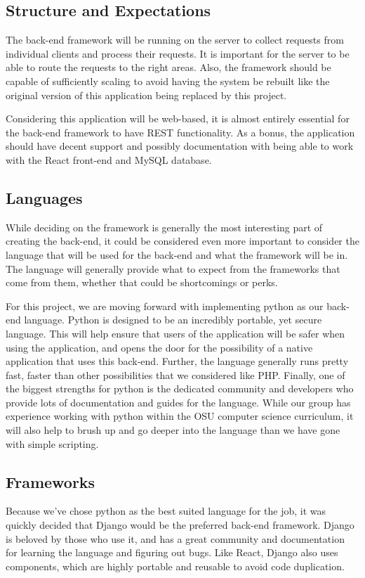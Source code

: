 \documentclass[onecolumn, draftclsnofoot,10pt, compsoc]{IEEEtran}
\begin{document}
    \subsection{Structure and Expectations}
        The back-end framework will be running on the server to collect requests from individual clients and process their requests. It is important for the server to be able to route the requests to the right areas. Also, the framework should be capable of sufficiently scaling to avoid having the system be rebuilt like the original version of this application being replaced by this project.
        
        Considering this application will be web-based, it is almost entirely essential for the back-end framework to have REST functionality. As a bonus, the application should have decent support and possibly documentation with being able to work with the React front-end and MySQL database. 
    \subsection{Languages}
        While deciding on the framework is generally the most interesting part of creating the back-end, it could be considered even more important to consider the language that will be used for the back-end and what the framework will be in. The language will generally provide what to expect from the frameworks that come from them, whether that could be shortcomings or perks.
        
        For this project, we are moving forward with implementing python as our back-end language. Python is designed to be an incredibly portable, yet secure language. This will help ensure that users of the application will be safer when using the application, and opens the door for the possibility of a native application that uses this back-end. Further, the language generally runs pretty fast, faster than other possibilities that we considered like PHP. Finally, one of the biggest strengths for python is the dedicated community and developers who provide lots of documentation and guides for the language\cite{intersog_2017}. While our group has experience working with python within the OSU computer science curriculum, it will also help to brush up and go deeper into the language than we have gone with simple scripting. 
    \subsection{Frameworks}
        Because we've chose python as the best suited language for the job, it was quickly decided that Django would be the preferred back-end framework. Django is beloved by those who use it, and has a great community and documentation for learning the language and figuring out bugs. Like React, Django also uses components, which are highly portable and reusable to avoid code duplication.\cite{malhotra_2018}
        
\end{document}
